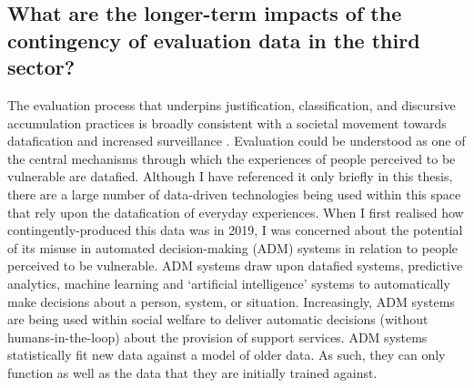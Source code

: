 \subsection{What are the longer-term impacts of the contingency of evaluation data in the third sector?}
The evaluation process that underpins justification, classification, and discursive accumulation practices is broadly consistent with a societal movement towards datafication and increased surveillance \citep{zuboff_age_2019, srnicek_platform_2016}. Evaluation could be understood as one of the central mechanisms through which the experiences of people perceived to be vulnerable are datafied. Although I have referenced it only briefly in this thesis, there are a large number of data-driven technologies being used within this space that rely upon the datafication of everyday experiences. When I first realised how contingently-produced this data was in 2019, I was concerned about the potential of its misuse in automated decision-making (ADM) systems in relation to people perceived to be vulnerable. ADM systems draw upon datafied systems, predictive analytics, machine learning and `artificial intelligence' systems to automatically make decisions about a person, system, or situation. Increasingly, ADM systems are being used within social welfare to deliver automatic decisions (without humans-in-the-loop) about the provision of support services. ADM systems statistically fit new data against a model of older data. As such, they can only function as well as the data that they are initially trained against. 

